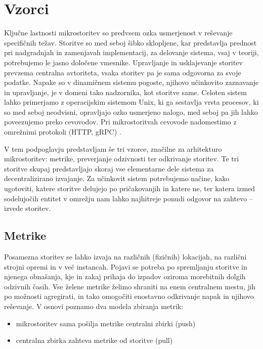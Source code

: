 \documentclass[a4paper, 12pt]{book}
\begin{document}
\section{Vzorci}

Ključne lastnosti mikrostoritev so predvsem ozka usmerjenost v reševanje specifičnih težav.
Storitve so med seboj šibko sklopljene, kar predstavlja prednost pri nadgradnjah in zamenjavah implementacij, za delovanje sistema, vsaj v teoriji, potrebujemo le jasno določene vmesnike.
Upravljanje in usklajevanje storitev prevzema centralna avtoriteta, vsaka storitev pa je sama odgovorna za svoje podatke.
Napake so v dinamičnem sistemu pogoste, njihovo učinkovito zaznavanje in upravljanje, je v domeni tako nadzornika, kot storitve same.
Celoten sistem lahko primerjamo z operacijskim sistemom Unix, ki ga sestavlja vrsta procesov, ki so med seboj neodvisni, opravljajo ozko usmerjeno nalogo, med seboj pa jih lahko poveezujemo preko cevovodov.
Pri mikrostoritvah cevovode nadomestimo z omrežnimi protokoli (HTTP, gRPC) \cite{microservicesMartin}.

V tem podpoglavju predstavljam še tri vzorce, značilne za arhitekturo mikrostoritev: metrike, preverjanje odzivnosti ter odkrivanje storitev.
Te tri storitve skupaj predstavljajo skoraj vse elementarne dele sistema za decentralizirano izvajanje.
Za učinkovit sistem potrebujemo načine, kako ugotoviti, katere storitve delujejo po pričakovanjih in katere ne, ter katera izmed sodelujočih entitet v omrežju nam lahko najhitreje ponudi odgovor na zahtevo -- izvede storitev.

\subsection{Metrike}

Posamezna storitev se lahko izvaja na različnih (fizičnih) lokacijah, na različni strojni opremi in v več instancah.
Pojavi se potreba po spremljanju storitve in njenega obnašanja, kje in zakaj prihaja do izpadov oziroma morebitnih dolgih odzivnih časih.
Vse želene metrike želimo shraniti na enem centralnem mestu, jih po možnosti agregirati, in tako omogočiti enostavno odkrivanje napak in njihovo reševanje.
V osnovi poznamo dva modela zbiranja metrik: 
\begin{itemize}
	\item mikrostoritev sama pošilja metrike centralni zbirki (push)
	\item centralna zbirka zahteva metrike od storitve (pull)
\end{itemize}
\end{document}
